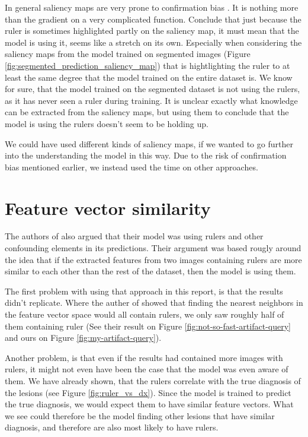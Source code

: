 In general saliency maps are very prone to confirmation bias \cite{sanity-checks-for-saliency,Grns2020FaithfulSM}.
It is nothing more than the gradient on a very complicated function.
Conclude that just because the ruler is sometimes highlighted partly on the saliency map,
it must mean that the model is using it, seems like a stretch on its own.
Especially when considering the saliency maps from the model trained on segmented images (Figure 
\ref{fig:segmented_prediction_saliency_map}) that is hightlighting the ruler to at least the same degree 
that the model trained on the entire dataset is.
We know for sure, that the model trained on the segmented dataset is not using the rulers,
as it has never seen a ruler during training.
It is unclear exactly what knowledge can be extracted from the saliency maps,
but using them to conclude that the model is using the rulers doesn't seem to be holding up.

We could have used different kinds of saliency maps, if we wanted to go further into the understanding 
the model in this way.
Due to the risk of confirmation bias mentioned earlier, we instead used the time on other approaches.

\section{Feature vector similarity}
The authors of \cite{debias-not-so-fast} also argued that their model was using rulers
and other confounding elements in its predictions.
Their argument was based rougly around the idea that if the extracted features from two images
containing rulers are more similar to each other than the rest of the dataset, then the model is using them.

The first problem with using that approach in this report, is that the results didn't replicate.
Where the auther of \cite{debias-not-so-fast} showed that finding the nearest neighbors in the feature
vector space would all contain rulers, we only saw roughly half of them containing ruler 
(See their result on Figure \ref{fig:not-so-fast-artifact-query} and ours on Figure \ref{fig:my-artifact-query}).

Another problem, is that even if the results had contained more images with rulers,
it might not even have been the case that the model was even aware of them.
We have already shown, that the rulers correlate with the true diagnosis of the lesions (see Figure \ref{fig:ruler_vs_dx}).
Since the model is trained to predict the true diagnosis, we would expect them to have similar feature vectors.
What we see could therefore be the model finding other lesions that have similar diagnosis,
and therefore are also most likely to have rulers.

